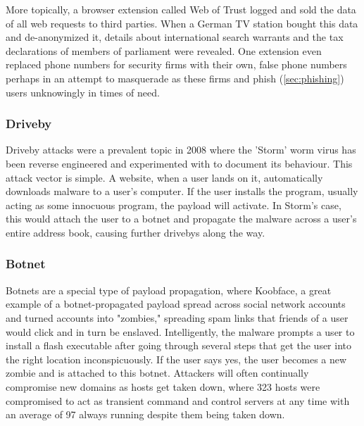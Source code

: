 \documentclass[a4paper, 11pt]{article}
\begin{document}
More topically, a browser extension called Web of Trust logged and sold the data of all web requests to third parties. When a German TV station bought this data and de-anonymized it, details about international search warrants and the tax declarations of members of parliament were revealed. \cite{ref:brucker2017evil} One extension even replaced phone numbers for security firms with their own, false phone numbers perhaps in an attempt to masquerade as these firms and phish (\ref{sec:phishing}) users unknowingly in times of need.

\subsubsection{Driveby}
\label{sec:driveby}
Driveby attacks were a prevalent topic in 2008 \cite{ref:kanich2008spamalytics} where the 'Storm' worm virus has been reverse engineered and experimented with to document its behaviour. This attack vector is simple. A website, when a user lands on it, automatically downloads malware to a user's computer. If the user installs the program, usually acting as some innocuous program, the payload will activate. In Storm's case, this would attach the user to a botnet and propagate the malware across a user's entire address book, causing further drivebys along the way.

\subsubsection{Botnet}
\label{sec:botnet}
Botnets are a special type of payload propagation, where Koobface, a great example of a botnet-propagated payload spread across social network accounts and turned accounts into "zombies," spreading spam links that friends of a user would click and in turn be enslaved. \cite{ref:thomas2010koobface} Intelligently, the malware prompts a user to install a flash executable after going through several steps that get the user into the right location inconspicuously. If the user says yes, the user becomes a new zombie and is attached to this botnet. Attackers will often continually compromise new domains as hosts get taken down, where 323 hosts were compromised to act as transient command and control servers at any time with an average of 97 always running despite them being taken down.
\end{document}
